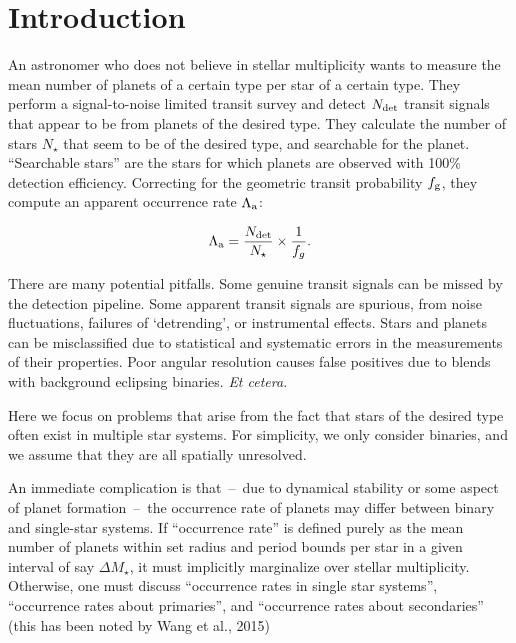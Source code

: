 \section{Introduction}

An astronomer who does not believe in stellar multiplicity wants to measure the
mean number of planets of a certain type per star of a certain type.
They perform a signal-to-noise limited transit survey and detect $N_{\rm det}$ 
transit signals that appear to be from planets of the desired type.  They 
calculate the number of stars $N_\star$ that seem to be of the desired type, 
and searchable for the planet.  ``Searchable stars'' are the stars for which 
planets are observed with 100\% detection efficiency. 
Correcting for the geometric 
transit probability $f_{\rm g}$, they compute an apparent occurrence rate 
$\Lambda_{\rm a}$:

\begin{equation}
\Lambda_{\rm a} = \frac{N_{\rm det}}{N_\star} \times \frac{1}{f_g}.
\end{equation}

There are many potential pitfalls.  Some genuine transit signals can be missed
by the detection pipeline.  Some apparent transit signals are spurious, from
noise fluctuations, failures of `detrending', or instrumental effects.  Stars
and planets can be misclassified due to statistical and systematic errors in
the measurements of their properties.  Poor angular resolution causes false
positives due to blends with background eclipsing binaries. {\it Et cetera}.

Here we focus on problems that arise from the fact that stars of the desired
type often exist in multiple star systems.
For simplicity, we only consider binaries, and we assume that they are all 
spatially unresolved.

An immediate complication is that~--~due to dynamical stability or some 
aspect of planet formation~--~the occurrence rate of planets may differ 
between binary and single-star systems.
If ``occurrence rate'' is defined purely as the mean number of planets within 
set radius and period bounds per star in a given interval of say $\Delta 
M_\star$, it must implicitly marginalize over stellar multiplicity.
Otherwise, one must discuss ``occurrence rates in single star systems'', 
``occurrence rates about primaries'', and
``occurrence rates about secondaries'' (this has been noted by Wang et al., 
2015)

